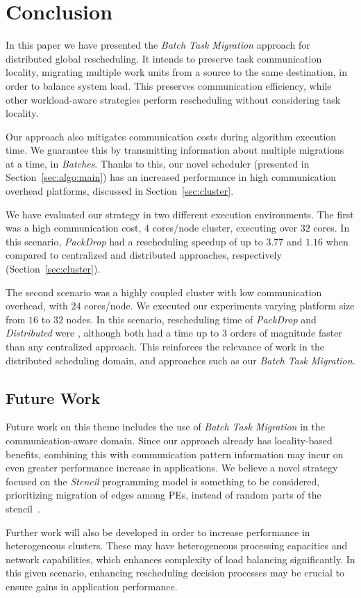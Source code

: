 \section{Conclusion} \label{sec:conclusion}

In this paper we have presented the \textit{Batch Task Migration} approach for distributed global rescheduling.
It intends to preserve task communication locality, migrating multiple work units from a source to the same destination, in order to balance system load.
This preserves communication efficiency, while other workload-aware strategies perform rescheduling without considering task locality.

Our approach also mitigates communication costs during algorithm execution time.
We guarantee this by transmitting information about multiple migrations at a time, in \textit{Batches}.
Thanks to this, our novel scheduler (presented in Section~\ref{sec:algo:main}) has an increased performance in high communication overhead platforms, discussed in Section~\ref{sec:cluster}.

We have evaluated our strategy in two different execution environments. 
The first was a high communication cost, $4$ cores/node cluster, executing over $32$ cores.
In this scenario, \textit{PackDrop} had a rescheduling speedup of up to $3.77$ and $1.16$ when compared to centralized and distributed approaches, respectively (Section~\ref{sec:cluster}).

The second scenario was a highly coupled cluster with low communication overhead, with $24$ cores/node.
We executed our experiments varying platform size from $16$ to $32$ nodes.
In this scenario, rescheduling time of \textit{PackDrop} and \textit{Distributed} were , although both had a time up to $3$ orders of magnitude faster than any centralized approach. %
This reinforces the relevance of work in the distributed scheduling domain, and approaches such as our \textit{Batch Task Migration}.

\subsection{Future Work}

Future work on this theme includes the use of \textit{Batch Task Migration} in the communication-aware domain.
Since our approach already has locality-based benefits, combining this with communication pattern information may incur on even greater performance increase in applications.
We believe a novel strategy focused on the \textit{Stencil} programming model is something to be considered, prioritizing migration of edges among PEs, instead of random parts of the stencil~\cite{stenciltiling}.

Further work will also be developed in order to increase performance in heterogeneous clusters.
These may have heterogeneous processing capacities and network capabilities, which enhances complexity of load balancing significantly.
In this given scenario, enhancing rescheduling decision processes may be crucial to ensure gains in application performance.